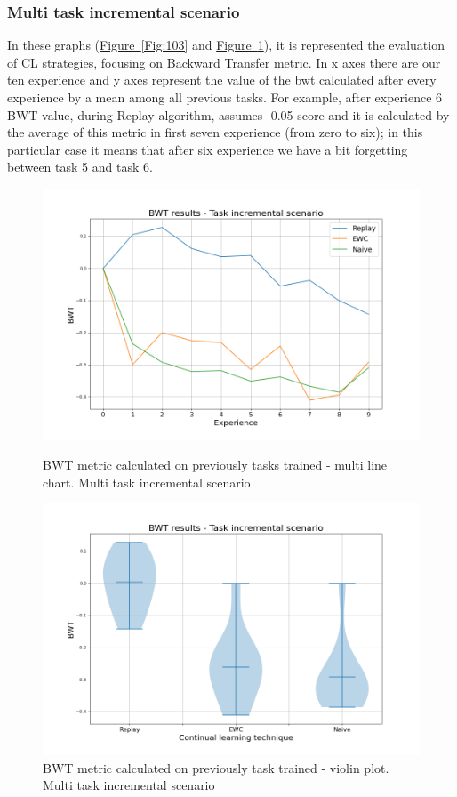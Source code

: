 \documentclass[english, LaM, oneside]{sapthesis}%
\begin{document}
\subsubsection{Multi task incremental scenario}
In these graphs (\hyperref[Fig:103]{Figure~\ref*{Fig:103}} and \hyperref[Fig:130]{Figure~\ref*{Fig:130}}), it is represented the evaluation of CL strategies, focusing on Backward Transfer metric. 
In x axes there are our ten experience and y axes represent the value of the bwt calculated after every experience by a mean among all previous tasks. For example, after experience 6 BWT value, during Replay algorithm, assumes -0.05 score and it is calculated by the average of this metric in first seven experience (from zero to six); in this particular case it means that after six experience we have a bit forgetting between task 5 and task 6.
\begin{figure}[h]
   \begin{minipage}{0.48\textwidth}
     \centering
     \includegraphics[width=1.1\linewidth]{overview_bwt_nc.png}
     \caption{BWT metric calculated on previously tasks trained - multi line chart. Multi task incremental scenario}\label{Fig:103}
   \end{minipage}\hfill
   \begin{minipage}{0.48\textwidth}
     \centering
     \includegraphics[width=1.1\linewidth]{overview2_bwt_nc.png}
     \caption{BWT metric calculated on previously task trained - violin plot. Multi task incremental scenario}\label{Fig:130}
   \end{minipage}
\end{figure}
\end{document}
